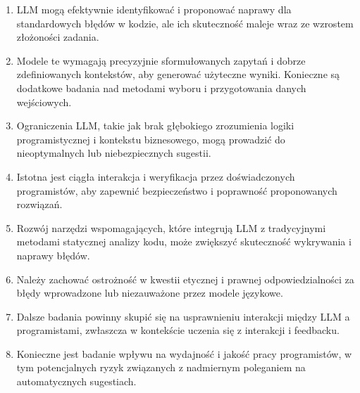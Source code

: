 \begin{enumerate}
    \item LLM mogą efektywnie identyfikować i proponować naprawy dla standardowych błędów w kodzie, ale ich skuteczność maleje wraz ze wzrostem złożoności zadania.
    \item Modele te wymagają precyzyjnie sformułowanych zapytań i dobrze zdefiniowanych kontekstów, aby generować użyteczne wyniki. Konieczne są dodatkowe badania nad metodami wyboru i przygotowania danych wejściowych.
    \item Ograniczenia LLM, takie jak brak głębokiego zrozumienia logiki programistycznej i kontekstu biznesowego, mogą prowadzić do nieoptymalnych lub niebezpiecznych sugestii.
    \item Istotna jest ciągła interakcja i weryfikacja przez doświadczonych programistów, aby zapewnić bezpieczeństwo i poprawność proponowanych rozwiązań.
    \item Rozwój narzędzi wspomagających, które integrują LLM z tradycyjnymi metodami statycznej analizy kodu, może zwiększyć skuteczność wykrywania i naprawy błędów.
    \item Należy zachować ostrożność w kwestii etycznej i prawnej odpowiedzialności za błędy wprowadzone lub niezauważone przez modele językowe.
    \item Dalsze badania powinny skupić się na usprawnieniu interakcji między LLM a programistami, zwłaszcza w kontekście uczenia się z interakcji i feedbacku.
    \item Konieczne jest badanie wpływu na wydajność i jakość pracy programistów, w tym potencjalnych ryzyk związanych z nadmiernym poleganiem na automatycznych sugestiach.
\end{enumerate}
